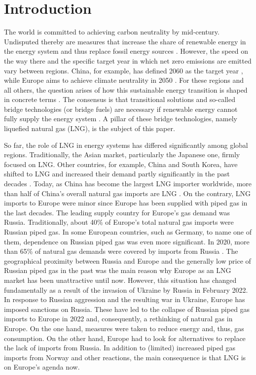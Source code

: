 \section{Introduction}
The world is committed to achieving carbon neutrality by mid-century. Undisputed thereby are measures that increase the share of renewable energy in the energy system and thus replace fossil energy sources \cite{yuan2022race}. However, the speed on the way there and the specific target year in which net zero emissions are emitted vary between regions. China, for example, has defined 2060 as the target year \cite{jia2021achieve}, while Europe aims to achieve climate neutrality in 2050 \cite{wolf2021european}. For these regions and all others, the question arises of how this sustainable energy transition is shaped in concrete terms \cite{capros2018outlook}. The consensus is that transitional solutions and so-called bridge technologies (or bridge fuels) are necessary if renewable energy cannot fully supply the energy system \cite{gursan2021systemic}. A pillar of these bridge technologies, namely liquefied natural gas (LNG), is the subject of this paper.\vspace{0.35cm}                
           
So far, the role of LNG in energy systems has differed significantly among global regions. Traditionally, the Asian market, particularly the Japanese one, firmly focused on LNG. Other countries, for example, China and South Korea, have shifted to LNG and increased their demand partly significantly in the past decades \cite{aguilera2014role}. Today, as China has become the largest LNG importer worldwide, more than half of China's overall natural gas imports are LNG \cite{lngimports}. On the contrary, LNG imports to Europe were minor since Europe has been supplied with piped gas in the last decades. The leading supply country for Europe's gas demand was Russia. Traditionally, about 40\% of Europe's total natural gas imports were Russian piped gas. In some European countries, such as Germany, to name one of them, dependence on Russian piped gas was even more significant. In 2020, more than 65\% of natural gas demands were covered by imports from Russia \cite{statista_gas}. The geographical proximity between Russia and Europe and the generally low price of Russian piped gas in the past was the main reason why Europe as an LNG market has been unattractive until now. However, this situation has changed fundamentally as a result of the invasion of Ukraine by Russia in February 2022. In response to Russian aggression and the resulting war in Ukraine, Europe has imposed sanctions on Russia. These have led to the collapse of Russian piped gas imports to Europe in 2022 and, consequently, a rethinking of natural gas in Europe. On the one hand, measures were taken to reduce energy and, thus, gas consumption. On the other hand, Europe had to look for alternatives to replace the lack of imports from Russia. In addition to (limited) increased piped gas imports from Norway and other reactions, the main consequence is that LNG is on Europe's agenda now.\vspace{0.35cm}          


